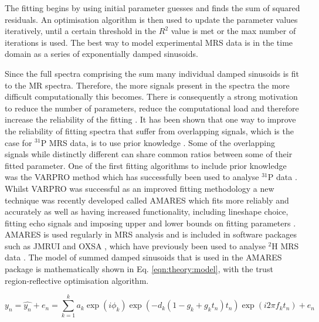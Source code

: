 \noindent The fitting begins by using initial parameter guesses and finds the sum of squared residuals. An optimisation algorithm is then used to update the parameter values iteratively, until a certain threshold in the $R^2$ value is met or the max number of iterations is used. The best way to model experimental \ac{MRS} data is in the time domain as a series of exponentially damped sinusoids. 

Since the full spectra comprising the sum many individual damped sinusoids is fit to the MR spectra. Therefore, the more signals present in the spectra the more difficult computationally this becomes. There is consequently a strong motivation to reduce the number of parameters, reduce the computational load and therefore increase the reliability of the fitting \cite{Near2021PreprocessingRecommendations}. It has been shown that one way to improve the reliability of fitting spectra that suffer from overlapping signals, which is the case for $^{31}$P \ac{MRS} data, is to use prior knowledge \cite{Hamilton2003PriorSpectra}. Some of the overlapping signals while distinctly different can share common ratios between some of their fitted parameter. One of the first fitting algorithms to include prior knowledge was the \ac{VARPRO} method \cite{Golub1973TheSeparate} which has successfully been used to analyse $^{31}$P data \cite{vanderVeen1988AccurateKnowledge,Stubbs199631P-MagneticADP}. Whilst \ac{VARPRO} was successful as an improved fitting methodology a new technique was recently developed called \ac{AMARES} which fits more reliably and accurately as well as having increased functionality, including lineshape choice, fitting echo signals and imposing upper and lower bounds on fitting parameters \cite{Vanhamme1997ImprovedKnowledge}. \ac{AMARES} is used regularly in \ac{MRS} analysis and is included in software packages such as JMRUI \cite{Stefan2009QuantitationPackage} and OXSA \cite{Purvis2017OXSA:MATLAB}, which have previously been used to analyse $^2$H \ac{MRS} data \cite{Simoes2022GlucoseGlioblastoma,Kreis2020MeasuringMRI,Kaggie2022DeuteriumMetabolism}. The model of summed damped sinusoids that is used in the \ac{AMARES} package is mathematically shown in Eq. \ref{eqn:theory:model}, with the trust region-reflective optimisation algorithm.

\begin{equation}
    y_n = \hat{y_n} + e_n = \sum_{k=1}^{k}a_k\exp(i\phi_k)\exp(-d_k(1-g_k+g_kt_n)t_n)\exp(i2\pi f_kt_n) + e_n
    \label{eqn:theory:model}
\end{equation}

